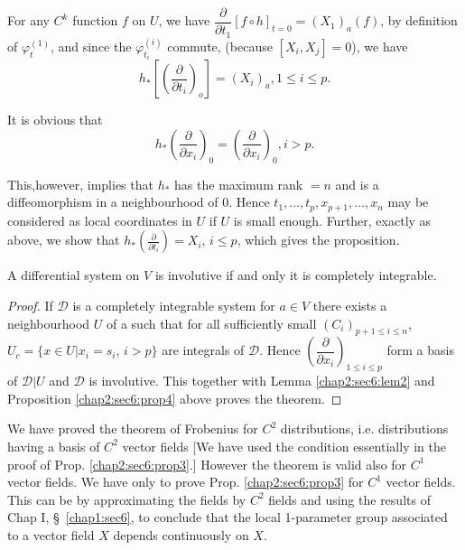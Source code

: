For any $C^k$ function $f$ on $U$, we have $\dfrac{\partial}{\partial
  t_1} [ f \circ h]_{t=0} = (X_1)_a (f)$, by definition of
$\varphi^{(1)}_t$, and since the $\varphi^{(i)}_{t_i}$ commute,
(because $[X_i, X_j] = 0$), we have 
$$
h_* \left[ \left(\frac{\partial}{\partial t_i}\right)_o\right] =
(X_i)_a, 1 \leq i \leq p. 
$$

It is obvious that
$$
h_* \left(\frac{\partial}{\partial x_i}\right)_0 = 
\left(\frac{\partial}{\partial x_i}\right)_0, i > p. 
$$

This,\pageoriginale however, implies that $h_*$ has the maximum rank $=n$ and is a
diffeomorphism in a neighbourhood of $0$. Hence $t_1, \ldots, t_p,
x_{p+1}, \ldots, x_n$ may be considered as local coordinates in $U$ if
$U$ is small enough. Further, exactly as above, we show that
$h_*(\frac{\partial}{\partial t_i}) = X_i$, $i \leq p$, which gives
the proposition. 

\setcounter{theorem}{0}
\begin{theorem}[Frobenius]\label{chap2:sec6:thm1}%
  A differential system on $V$ is involutive if and only
  it is completely integrable. 
\end{theorem}

\begin{proof}
  If $\mathscr{D}$ is a completely integrable system for $a \in V$
  there exists a neighbourhood $U$ of a such that for all sufficiently
  small $(C_i)_{p+1 \leq i \leq n}$, $U_c = \{ x \in U | x_i = s_i$,
  $i > p\}$ are integrals of $\mathscr{D}$. Hence
  $\left(\dfrac{\partial}{\partial x_i}\right)_{1 \leq i \leq p}$ form a basis of
  $\mathscr{D}| U$ and $\mathscr{D}$ is involutive. This together with
  Lemma \ref{chap2:sec6:lem2} and Proposition \ref{chap2:sec6:prop4}
  above proves the theorem.  
\end{proof}

\begin{remark*}
  We have proved the theorem of Frobenius for $C^2$ distributions,
  i.e. distributions having a basis of $C^2$ vector fields [We have
    used the condition essentially in the proof of
    Prop. \ref{chap2:sec6:prop3}.] However
  the theorem is valid also for $C^1$ vector fields. We have only to
  prove Prop. \ref{chap2:sec6:prop3} for $C^1$ vector fields. This can
  be by approximating 
  the fields by $C^2$ fields and using the results of Chap I,
  \S\ \ref{chap1:sec6}, to
  conclude that the local 1-parameter group associated to a vector
  field $X$ depends continuously on $X$. 
\end{remark*}

